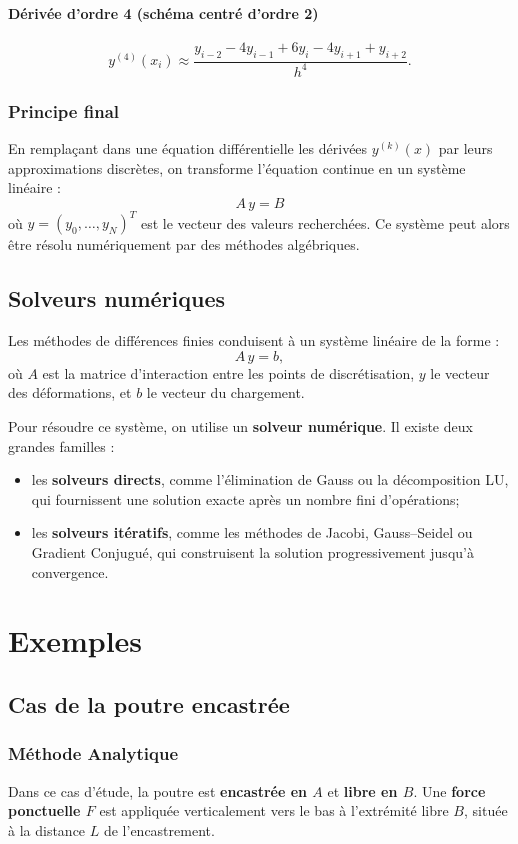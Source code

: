 \documentclass[12pt, a4paper]{article}
\begin{document}
\paragraph{Dérivée d’ordre 4 (schéma centré d’ordre 2)}
\[
y^{(4)}(x_i)
\approx
\frac{y_{i-2} - 4y_{i-1} + 6y_i - 4y_{i+1} + y_{i+2}}{h^4}.
\]

\subsubsection{Principe final}
En remplaçant dans une équation différentielle les dérivées 
$y^{(k)}(x)$ par leurs approximations discrètes, 
on transforme l’équation continue en un système linéaire :
\[
A\,y = B
\]
où $y = (y_0,\dots,y_N)^T$ est le vecteur des valeurs recherchées.
Ce système peut alors être résolu numériquement par des méthodes algébriques.

\subsection{Solveurs numériques}

Les méthodes de différences finies conduisent à un système linéaire de la forme :
\[
A \, y = b,
\]
où $A$ est la matrice d'interaction entre les points de discrétisation, $y$ le vecteur des déformations, et $b$ le vecteur du chargement.

Pour résoudre ce système, on utilise un \textbf{solveur numérique}. Il existe deux grandes familles :
\begin{itemize}
\item les \textbf{solveurs directs}, comme l’élimination de Gauss ou la décomposition LU, qui fournissent une solution exacte après un nombre fini d’opérations;
  \item les \textbf{solveurs itératifs}, comme les méthodes de Jacobi, Gauss–Seidel ou Gradient Conjugué, qui construisent la solution progressivement jusqu’à convergence.
\end{itemize}

\section{Exemples}
\subsection{Cas de la poutre encastrée}

\subsubsection{Méthode Analytique}
Dans ce cas d'étude, la poutre est \textbf{encastrée en $A$} et \textbf{libre en $B$}. 
Une \textbf{force ponctuelle $F$} est appliquée verticalement vers le bas à l’extrémité libre $B$, située à la distance $L$ de l’encastrement. 
\end{document}
